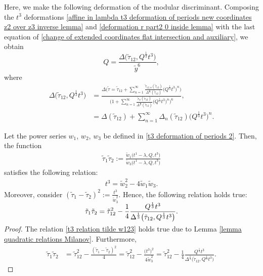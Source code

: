 Here, we make the following deformation of the modular discriminant. Composing the $t^3$ deformations \eqref{affine in lambda t3 deformation of periods new coordinates z2 over z3 inverse lemma} and \eqref{deformation r part2 0 inside lemma} with the last equation of \eqref{change of extended coordinates flat intersection and auxiliary}, we obtain
\[%
Q=\frac{\Delta\bigl(\tilde\tau_{12},Q^{\frac{1}{3}} t^3 \bigr)}{\tilde y^6},
\]
where
\begin{align}
\Delta\bigl(\tilde\tau_{12},Q^{\frac{1}{3}}t^3\bigr)&=\frac{\Delta\bigl(\tilde\tau=\tilde\tau_{12}+\sum_{n=1}^{\infty}\frac{\tilde\tau_{12,n}(\tilde\tau_{12})}{\Delta^{\frac{n}{3}}(\tilde\tau_{12})} \bigl( Q^{\frac{1}{3}}t^3\bigr)^n \bigr)}{\bigl( 1+\sum_{n=1}^{\infty} \frac{\tilde r_n(\tilde\tau_{12})}{\Delta^{\frac{n}{3}}(\tilde\tau_{12})} \bigl( Q^{\frac{1}{3}}t^3 \bigr)^n \bigr)^6},\nonumber\\
&=\Delta(\tilde\tau_{12})+\sum_{n=1}^{\infty} \Delta_n(\tilde\tau_{12})\bigl( Q^{\frac{1}{3}}t^3 \bigr)^n.\label{modular deformation tilde 0}
\end{align}



\begin{Lemma}\label{lemma w1 dependence of t3 e Q root 3}
Let the power series $w_1$, $w_2$, $w_3$ be defined in \eqref{t3 deformation of periods 2}.
Then, the function
\begin{gather*}
\tilde\tau_1\tilde\tau_2:= \frac{\tilde w_1\bigl(t^1-\lambda,Q,t^3\bigr)}{\tilde w_3\bigl(t^1-\lambda,Q,t^3\bigr)}
\end{gather*}
satisfies the following relation:
\begin{gather}\label{t3 relation tilde w123}
t^3=\tilde w_2^2-4\tilde w_1\tilde w_3.
\end{gather}
Moreover, consider
$
(\tilde\tau_1-\tilde\tau_2 )^2:=\frac{t^3}{\tilde w_3^2}$.
Hence, the following relation holds true:
\[
\tilde\tau_1\tilde\tau_2=\tilde\tau_{12}^2-\smash{\frac{1}{4}\frac{Q^{\frac{1}{3}}t^3 }{\Delta^{\frac{1}{3}}\bigl(\tilde\tau_{12},Q^{\frac{1}{3}}t^3\bigr)}}.
\]
\end{Lemma}

\begin{proof}
The relation \eqref{t3 relation tilde w123} holds true due to Lemma \ref{lemma quadratic relations Milanov}. Furthermore,
\begin{align*}
\tilde\tau_1\tilde\tau_2&= \tilde\tau_{12}^2-\frac{( \tilde\tau_1-\tilde\tau_2)^2}{4}= \tilde\tau_{12}^2-\frac{\bigl(t^3\bigr)^2}{4\tilde w_3^2}=\tilde\tau_{12}^2-\frac{1}{4}\frac{Q^{\frac{1}{3}}t^3 }{\Delta^{\frac{1}{3}}\bigl(\tilde\tau_{12},Q^{\frac{1}{3}}t^3\bigr)}.\tag*{\qed}
\end{align*} \renewcommand{\qed}{}
\end{proof}

